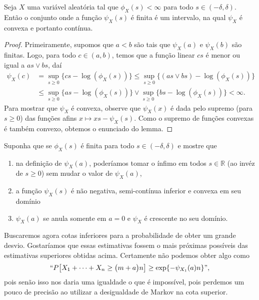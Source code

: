 \begin{lemma}
  Seja $X$ uma variável aleatória tal que $\phi_X(s) < \infty$ para todo $s \in (-\delta, \delta)$.
  Então o conjunto onde a função $\psi_X(s)$ é finita é um intervalo, na qual $\psi_X$ é convexa e portanto contínua.
\end{lemma}

\begin{proof}
  Primeiramente, supomos que $a < b$ são tais que $\psi_X(a)$ e $\psi_X(b)$ são finitas.
  Logo, para todo $c \in (a, b)$, temos que a função linear $cs$ é menor ou igual a $as \vee bs$, daí
  \begin{equation}
    \begin{split}
      \psi_X(c) &= \sup_{s \geq 0} \{cs - \log(\phi_X(s))\} \leq  \sup_{s \geq 0} \{(as \vee bs) - \log(\phi_X(s))\}\\
      & \leq \sup_{s \geq 0} \{as - \log(\phi_X(s))\} \vee \sup_{s \geq 0} \{bs - \log(\phi_X(s))\} < \infty.
    \end{split}
  \end{equation}
  Para mostrar que $\psi_X$ é convexa, observe que $\psi_X(x)$ é dada pelo supremo (para $s \geq 0$) das funções afins $x \mapsto xs - \psi_X(s)$.
  Como o supremo de funções convexas é também convexo, obtemos o enunciado do lemma.
\end{proof}


\begin{exercise}
  Suponha que se $\phi_{X}(s)$ é finita para todo $s \in (-\delta, \delta)$ e mostre que
  \begin{enumerate}[\quad a)]
  \item na definição de $\psi_{X}(a)$, poderíamos tomar o ínfimo em todos $s \in \mathbb{R}$ (ao invéz de $s \geq 0$) sem mudar o valor de $\psi_X(a)$,
  \item a função $\psi_{X}(s)$ é não negativa, semi-contínua inferior e convexa em seu domínio
  \item $\psi_X(a)$ se anula somente em $a = 0$ e $\psi_X$ é crescente no seu domínio.
  \end{enumerate}
\end{exercise}

Buscaremos agora cotas inferiores para a probabilidade de obter um grande desvio.
Gostaríamos que essas estimativas fossem o mais próximas possíveis das estimativas superiores obtidas acima.
Certamente não podemos obter algo como
\begin{equation}
  \label{e:PGDgeq_falso}
  `` P\big[ X_1 + \dots + X_n \geq \big(m + a \big) n \big] \geq \exp\{-\psi_{X_1}(a) n\} ",
\end{equation}
pois senão isso nos daria uma igualdade o que é impossível, pois perdemos um pouco de precisão ao utilizar a desigualdade de Markov na cota superior.

